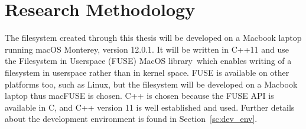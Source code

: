 
\section{Research Methodology}%

The filesystem created through this thesis will be developed on a Macbook laptop running macOS Monterey, version 12.0.1. It will be written in C++11 and use the Filesystem in Userspace (FUSE) MacOS library\,\cite{HomeMacFUSE} which enables writing of a filesystem in userspace rather than in kernel space. FUSE is available on other platforms too, such as Linux, but the filesystem will be developed on a Macbook laptop thus macFUSE is chosen. C++ is chosen because the FUSE API is available in C, and C++ version 11 is well established and used. Further details about the development environment is found in Section~\ref{sc:dev_env}.

